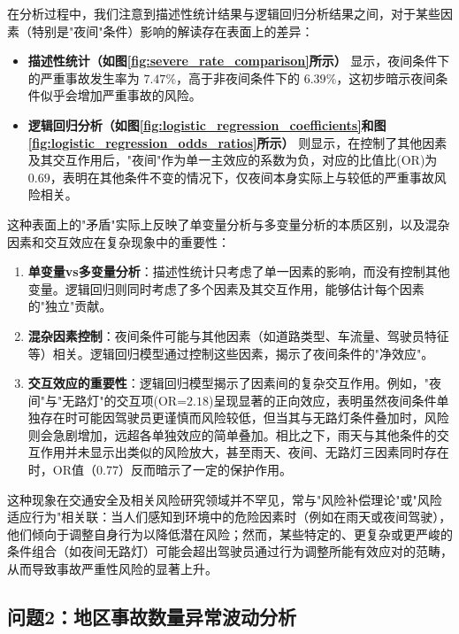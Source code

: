 \documentclass[12pt,a4paper]{article}
\begin{document}
在分析过程中，我们注意到描述性统计结果与逻辑回归分析结果之间，对于某些因素（特别是"夜间"条件）影响的解读存在表面上的差异：

\begin{itemize}
\item \textbf{描述性统计（如图\ref{fig:severe_rate_comparison}所示）} 显示，夜间条件下的严重事故发生率为 $7.47\%$，高于非夜间条件下的 $6.39\%$，这初步暗示夜间条件似乎会增加严重事故的风险。

\item \textbf{逻辑回归分析（如图\ref{fig:logistic_regression_coefficients}和图\ref{fig:logistic_regression_odds_ratios}所示）} 则显示，在控制了其他因素及其交互作用后，"夜间"作为单一主效应的系数为负，对应的比值比(OR)为 $0.69$，表明在其他条件不变的情况下，仅夜间本身实际上与较低的严重事故风险相关。
\end{itemize}

这种表面上的"矛盾"实际上反映了单变量分析与多变量分析的本质区别，以及混杂因素和交互效应在复杂现象中的重要性：

\begin{enumerate}
\item \textbf{单变量vs多变量分析}：描述性统计只考虑了单一因素的影响，而没有控制其他变量。逻辑回归则同时考虑了多个因素及其交互作用，能够估计每个因素的"独立"贡献。

\item \textbf{混杂因素控制}：夜间条件可能与其他因素（如道路类型、车流量、驾驶员特征等）相关。逻辑回归模型通过控制这些因素，揭示了夜间条件的"净效应"。

\item \textbf{交互效应的重要性}：逻辑回归模型揭示了因素间的复杂交互作用。例如，"夜间"与"无路灯"的交互项(OR=$2.18$)呈现显著的正向效应，表明虽然夜间条件单独存在时可能因驾驶员更谨慎而风险较低，但当其与无路灯条件叠加时，风险则会急剧增加，远超各单独效应的简单叠加。相比之下，雨天与其他条件的交互作用并未显示出类似的风险放大，甚至雨天、夜间、无路灯三因素同时存在时，OR值（$0.77$）反而暗示了一定的保护作用。
\end{enumerate}

这种现象在交通安全及相关风险研究领域并不罕见，常与"风险补偿理论"或"风险适应行为"相关联：当人们感知到环境中的危险因素时（例如在雨天或夜间驾驶），他们倾向于调整自身行为以降低潜在风险；然而，某些特定的、更复杂或更严峻的条件组合（如夜间无路灯）可能会超出驾驶员通过行为调整所能有效应对的范畴，从而导致事故严重性风险的显著上升。

\subsection{问题2：地区事故数量异常波动分析}
\end{document}
